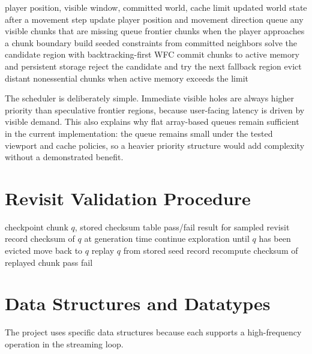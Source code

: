 \documentclass[12pt,a4paper]{report}
\begin{document}
\begin{algorithm}[H]
\caption{Streaming Chunk Generation}
\begin{algorithmic}[1]
\Require player position, visible window, committed world, cache limit
\Ensure updated world state after a movement step
\State update player position and movement direction
\State queue any visible chunks that are missing
\State queue frontier chunks when the player approaches a chunk boundary
  \State build seeded constraints from committed neighbors
  \State solve the candidate region with backtracking-first WFC
    \State commit chunks to active memory and persistent storage
  \Else
    \State reject the candidate and try the next fallback region
  \EndIf
\EndWhile
\State evict distant nonessential chunks when active memory exceeds the limit
\end{algorithmic}
\end{algorithm}

The scheduler is deliberately simple. Immediate visible holes are always higher priority than speculative frontier regions, because user-facing latency is driven by visible demand. This also explains why flat array-based queues remain sufficient in the current implementation: the queue remains small under the tested viewport and cache policies, so a heavier priority structure would add complexity without a demonstrated benefit.

\section{Revisit Validation Procedure}
\begin{algorithm}[H]
\caption{Sampled Revisit Validation}
\begin{algorithmic}[1]
\Require checkpoint chunk $q$, stored checksum table
\Ensure pass/fail result for sampled revisit
\State record checksum of $q$ at generation time
\State continue exploration until $q$ has been evicted
\State move back to $q$
\State replay $q$ from stored seed record
\State recompute checksum of replayed chunk
  \State \Return pass
\Else
  \State \Return fail
\EndIf
\end{algorithmic}
\end{algorithm}

\section{Data Structures and Datatypes}
The project uses specific data structures because each supports a high-frequency operation in the streaming loop.
\end{document}
